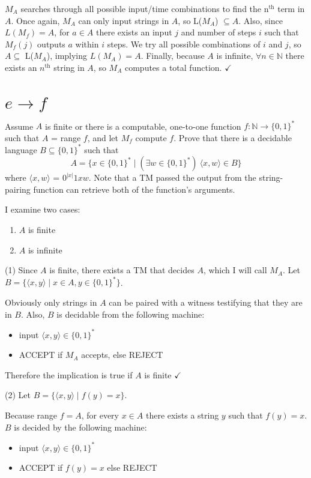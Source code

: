 \documentclass[11pt]{article}
\let\imp\rightarrow
\begin{document}
$M_A$ searches through all possible input/time combinations to find the n$^{\text{th}}$ term in $A$.
Once again, $M_A$ can only input strings in $A$, so L($M_A$) $\subseteq A$.
Also, since $L(M_f) = A$, for $a \in A$ there exists an input $j$ and number of steps $i$ such that $M_f(j)$ outputs $a$ within $i$ steps.
We try all possible combinations of $i$ and $j$, so $A \subseteq$ L($M_A$), implying $L(M_A) = A$.
Finally, because $A$ is infinite, $\forall n \in \mathbb{N}$ there exists an $n^{\text{th}}$ string in $A$, so $M_A$ computes a total function. $\checkmark$


\section*{$e \imp f$}

Assume $A$ is finite or there is a computable, one-to-one function $f: \mathbb{N} \imp \{0,1\}^*$ such that $A$ = range $f$, and let $M_f$ compute $f$.
Prove that there is a decidable language $B \subseteq \{0,1\}^*$ such that
	\[A = \{x \in \{0,1\}^* \mid (\exists w \in \{0,1\}^*)\ \langle x,w \rangle \in B \} \]
where $\langle x,w \rangle$ = $0^{|x|}1xw$. 
Note that a TM passed the output from the string-pairing function can retrieve both of the function's arguments.

I examine two cases:
\begin{enumerate}[(1)]
	\item $A$ is finite
	\item $A$ is infinite
\end{enumerate}

(1) Since $A$ is finite, there exists a TM that decides $A$, which I will call $M_A$.
Let $B = \{\langle x, y \rangle \mid x \in A, y \in \{0,1\}^* \}$.

Obviously only strings in $A$ can be paired with a witness testifying that they are in $B$.
Also, $B$ is decidable from the following machine:
\begin{itemize}
	\item input $\langle x, y \rangle \in \{0,1\}^*$
	\item ACCEPT if $M_A$ accepts, else REJECT
\end{itemize}

Therefore the implication is true if $A$ is finite $\checkmark$

(2) Let $B = \{ \langle x, y\rangle \mid f(y) = x\}$.

Because range $f = A$, for every $x \in A$ there exists a string $y$ such that $f(y) = x$.
$B$ is decided by the following machine:
\begin{itemize}
	\item input $\langle x, y\rangle \in \{0,1\}^*$
	\item ACCEPT if $f(y)=x$ else REJECT
\end{itemize}
\end{document}
